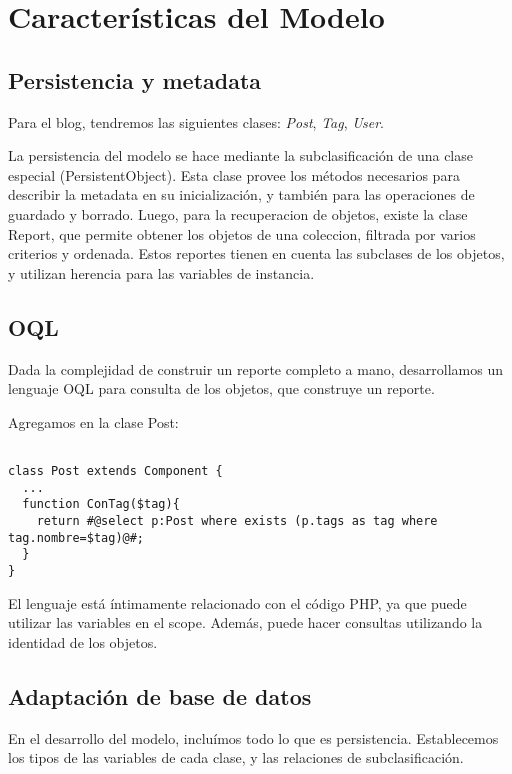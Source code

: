 \section{Características del Modelo}

\subsection{Persistencia y metadata}
\label{sub-pers}

Para el blog, tendremos las siguientes clases: \emph{Post}, \emph{Tag}, \emph{User}.


La persistencia del modelo se hace mediante la subclasificación de una clase especial (PersistentObject).
Esta clase provee los métodos necesarios para describir la metadata en su inicialización, y también para las operaciones de guardado y borrado.
Luego, para la recuperacion de objetos, existe la clase Report, que permite obtener los objetos de una
coleccion, filtrada por varios criterios y ordenada. Estos reportes tienen en cuenta las subclases de los objetos, y utilizan herencia para las variables de instancia.

\subsection{OQL}
\label{sub-oql}
Dada la complejidad de construir un reporte completo a mano, desarrollamos un lenguaje OQL para consulta de los objetos, que construye un reporte.

Agregamos en la clase Post:

\begin{verbatim}

class Post extends Component {
  ...
  function ConTag($tag){
    return #@select p:Post where exists (p.tags as tag where tag.nombre=$tag)@#;
  }
}

\end{verbatim}

El lenguaje está íntimamente relacionado con el código PHP, ya que puede utilizar las variables en el scope. Además, puede hacer consultas utilizando la identidad de los objetos.

\subsection{Adaptación de base de datos}
\label{sub-adapt}
En el desarrollo del modelo, incluímos todo lo que es persistencia. Establecemos los tipos de las variables de cada clase, y las relaciones de subclasificación.

